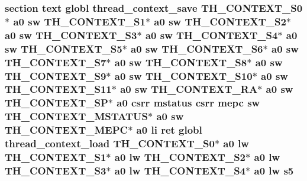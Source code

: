 \hypertarget{riscv_2threada_8S_a84e2b4c314692302759abcd79bc752b5}{
\subsubsection[{s5}]{\setlength{\rightskip}{0pt plus 5cm}section text globl {\bf thread\-\_\-context\-\_\-save} {\bf T\-H\-\_\-\-C\-O\-N\-T\-E\-X\-T\-\_\-\-S0}$\ast$ {\bf a0} {\bf sw} {\bf T\-H\-\_\-\-C\-O\-N\-T\-E\-X\-T\-\_\-\-S1}$\ast$ {\bf a0} {\bf sw} {\bf T\-H\-\_\-\-C\-O\-N\-T\-E\-X\-T\-\_\-\-S2}$\ast$ {\bf a0} {\bf sw} {\bf T\-H\-\_\-\-C\-O\-N\-T\-E\-X\-T\-\_\-\-S3}$\ast$ {\bf a0} {\bf sw} {\bf T\-H\-\_\-\-C\-O\-N\-T\-E\-X\-T\-\_\-\-S4}$\ast$ {\bf a0} {\bf sw} {\bf T\-H\-\_\-\-C\-O\-N\-T\-E\-X\-T\-\_\-\-S5}$\ast$ {\bf a0} {\bf sw} {\bf T\-H\-\_\-\-C\-O\-N\-T\-E\-X\-T\-\_\-\-S6}$\ast$ {\bf a0} {\bf sw} {\bf T\-H\-\_\-\-C\-O\-N\-T\-E\-X\-T\-\_\-\-S7}$\ast$ {\bf a0} {\bf sw} {\bf T\-H\-\_\-\-C\-O\-N\-T\-E\-X\-T\-\_\-\-S8}$\ast$ {\bf a0} {\bf sw} {\bf T\-H\-\_\-\-C\-O\-N\-T\-E\-X\-T\-\_\-\-S9}$\ast$ {\bf a0} {\bf sw} {\bf T\-H\-\_\-\-C\-O\-N\-T\-E\-X\-T\-\_\-\-S10}$\ast$ {\bf a0} {\bf sw} {\bf T\-H\-\_\-\-C\-O\-N\-T\-E\-X\-T\-\_\-\-S11}$\ast$ {\bf a0} {\bf sw} {\bf T\-H\-\_\-\-C\-O\-N\-T\-E\-X\-T\-\_\-\-R\-A}$\ast$ {\bf a0} {\bf sw} {\bf T\-H\-\_\-\-C\-O\-N\-T\-E\-X\-T\-\_\-\-S\-P}$\ast$ {\bf a0} csrr {\bf mstatus} csrr {\bf mepc} {\bf sw} {\bf T\-H\-\_\-\-C\-O\-N\-T\-E\-X\-T\-\_\-\-M\-S\-T\-A\-T\-U\-S}$\ast$ {\bf a0} {\bf sw} {\bf T\-H\-\_\-\-C\-O\-N\-T\-E\-X\-T\-\_\-\-M\-E\-P\-C}$\ast$ {\bf a0} {\bf li} ret globl {\bf thread\-\_\-context\-\_\-load} {\bf T\-H\-\_\-\-C\-O\-N\-T\-E\-X\-T\-\_\-\-S0}$\ast$ {\bf a0} {\bf lw} {\bf T\-H\-\_\-\-C\-O\-N\-T\-E\-X\-T\-\_\-\-S1}$\ast$ {\bf a0} {\bf lw} {\bf T\-H\-\_\-\-C\-O\-N\-T\-E\-X\-T\-\_\-\-S2}$\ast$ {\bf a0} {\bf lw} {\bf T\-H\-\_\-\-C\-O\-N\-T\-E\-X\-T\-\_\-\-S3}$\ast$ {\bf a0} {\bf lw} {\bf T\-H\-\_\-\-C\-O\-N\-T\-E\-X\-T\-\_\-\-S4}$\ast$ {\bf a0} {\bf lw} s5}}\label{riscv_2threada_8S_a84e2b4c314692302759abcd79bc752b5}

